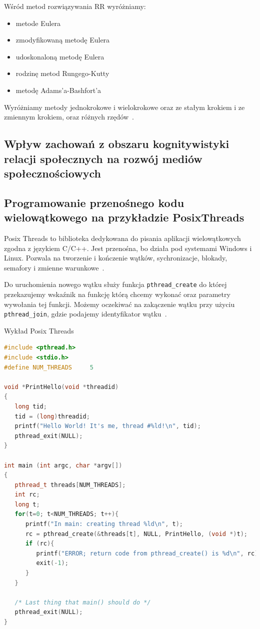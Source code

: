 \documentclass[wi]{zut}
\begin{document}
Wśród metod rozwiązywania RR wyróżniamy:
\begin{itemize}
    \item metode Eulera
    \item zmodyfikowaną metodę Eulera
    \item udoskonaloną metodę Eulera
    \item rodzinę metod Rungego-Kutty
    \item metodę Adams'a-Bashfort'a
\end{itemize}

Wyróżniamy metody jednokrokowe i wielokrokowe oraz ze stałym krokiem i ze zmiennym krokiem, oraz różnych rzędów~\cite{Piela_RR}.

\subsection{Wpływ zachowań z obszaru kognitywistyki relacji społecznych na rozwój mediów społecznościowych}

\subsection{Programowanie przenośnego kodu wielowątkowego na przykładzie PosixThreads}

Posix Threads to biblioteka dedykowana do pisania aplikacji wielowątkowych zgodna z językiem C/C++. Jest przenośna, bo działa pod systemami Windows i Linux. Pozwala na tworzenie i kończenie wątków, sychronizacje, blokady, semafory i zmienne warunkowe~\cite{Palkowski_POSIX}.

Do uruchomienia nowego wątku służy funkcja \lstinline{pthread_create} do której przekazujemy wskaźnik na funkcję którą chcemy wykonać oraz parametry wywołania tej funkcji. Możemy oczekiwać na zakączenie wątku przy użyciu \lstinline{pthread_join}, gdzie podajemy identyfikator wątku~\cite{Palkowski_POSIX}.

{Wykład Posix Threads \cite{Palkowski_POSIX}}{\label{kod:przyklad}}
\begin{lstlisting}[language=C++]
#include <pthread.h>
#include <stdio.h>
#define NUM_THREADS     5

void *PrintHello(void *threadid)
{
   long tid;
   tid = (long)threadid;
   printf("Hello World! It's me, thread #%ld!\n", tid);
   pthread_exit(NULL);
}

int main (int argc, char *argv[])
{
   pthread_t threads[NUM_THREADS];
   int rc;
   long t;
   for(t=0; t<NUM_THREADS; t++){
      printf("In main: creating thread %ld\n", t);
      rc = pthread_create(&threads[t], NULL, PrintHello, (void *)t);
      if (rc){
         printf("ERROR; return code from pthread_create() is %d\n", rc);
         exit(-1);
      }
   }

   /* Last thing that main() should do */
   pthread_exit(NULL);
}
\end{lstlisting}
\end{document}
